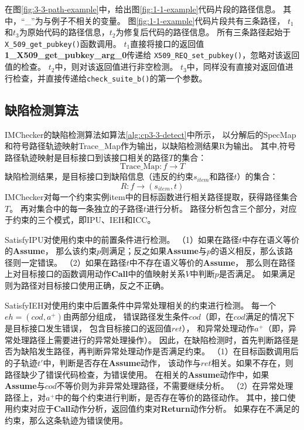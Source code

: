 在图\ref{fig:3-3-path-example}中，给出图\ref{fig:1-1-example}代码片段的路径信息。
其中，“\_”为与例子不相关的变量。
图\ref{fig:1-1-example}代码片段共有三条路径，
$t_1$和$t_3$为原始代码的路径信息，$t_2$为修复后代码的路径信息。
所有三条路径起始于\texttt{X\_509\_get\_pubkey()}函数调用。
$t_1$直接将接口的返回值\textbf{1\_X509\_get\_pubkey\_arg\_0}传递给
\texttt{X509\_REQ\_set\_pubkey()}，忽略对该返回值的检查。
$t_2$中，则对该返回值进行非空检测。
$t_3$中，同样没有直接对返回值进行检查，并直接传递给\texttt{check\_suite\_b()}的第一个参数。



\subsection{缺陷检测算法}


IMChecker的缺陷检测算法如算法\ref{alg:cp3-3-detect}中所示，
以分解后的SpecMap和符号路径轨迹映射Trace\_Map作为输出，以缺陷检测结果R为输出。
其中,符号路径轨迹映射是目标接口到该接口相关的路径$T$的集合：
$$\text{Trace\_Map}: f \rightarrow T$$
缺陷检测结果，是目标接口到缺陷信息（违反的约束$s_{item}$和路径$t$）的集合：
$$R: f \rightarrow (s_{item}, t)$$
IMChecker对每一个约束实例item中的目标函数进行相关路径提取，获得路径集合$T$。
再对集合中的每一条独立的子路径$t$进行分析。
路径分析包含三个部分，对应于约束的三个模式，即IPU、IEH和ICC。

SatisfyIPU对使用约束中的前置条件进行检测。
（1）如果在路径$t$中存在语义等价的\textbf{Assume}，
那么该约束$p$则满足；反之如果\textbf{Assume}与$p$的语义相反，那么该路径则一定错误。
（2）如果在路径$t$中不存在语义等价的\textbf{Assume}，
那么则在路径上对目标接口的函数调用动作\textbf{Call}中的值映射关系$V$中判断$p$是否满足。
如果满足则为路径对目标接口使用正确，反之不正确。

SatisfyIEH对使用约束中后置条件中异常处理相关的约束进行检测。
每一个$eh=(cod, a^+)$由两部分组成，
错误路径发生条件$cod$（即，在$cod$满足的情况下是目标接口发生错误，
包含目标接口的返回值$ret$），
和异常处理动作$a^+$（即，异常处理路径上需要进行的异常处理操作）。
因此，在缺陷检测时，首先判断路径是否为缺陷发生路径，再判断异常处理动作是否满足约束。
（1）在目标函数调用后的子轨迹$t'$中，判断是否存在\textbf{Assume}动作，
该动作与$ret$相关。如果不存在，则路径缺少了错误代码检查，为错误使用。
在相关的\textbf{Assume}动作中，如果\textbf{Assume}与$cod$不等价则为非异常处理路径，不需要继续分析。
（2）在异常处理路径上，对$a^+$中的每个约束进行判断，是否存在等价的路径动作。
其中，接口使用约束对应于\textbf{Call}动作分析，返回值约束对\textbf{Return}动作分析。
如果存在不满足的约束，那么这条轨迹为错误使用。

